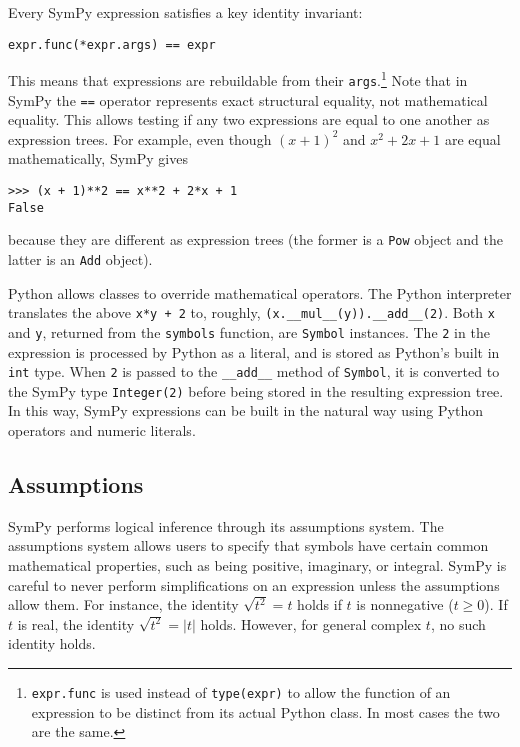 Every SymPy expression satisfies a key identity invariant:
\begin{verbatim}
expr.func(*expr.args) == expr
\end{verbatim}
This means that expressions are
rebuildable from their \texttt{args}.\footnote{\texttt{expr.func} is used
instead of \texttt{type(expr)} to allow the function of an expression to be
distinct from its actual Python class. In most cases the two are the same.}
Note that in SymPy the \texttt{==} operator represents exact
structural equality, not mathematical equality. This allows testing if any two
expressions are equal to one another as expression trees. For example, even
though ${(x + 1)}^2$ and $x^2 + 2x + 1$ are equal mathematically, SymPy gives
\begin{verbatim}
>>> (x + 1)**2 == x**2 + 2*x + 1
False
\end{verbatim}
because they are different as expression trees (the former is a \verb|Pow|
object and the latter is an \verb|Add| object).

Python allows classes to override mathematical operators. The Python
interpreter translates the above \texttt{x*y + 2} to, roughly,
\verb|(x.__mul__(y)).__add__(2)|. Both \texttt{x} and \texttt{y}, returned
from the \texttt{symbols} function, are \texttt{Symbol} instances. The
\texttt{2} in the expression is processed by Python as a literal, and is
stored as Python's built in \texttt{int} type. When \texttt{2} is passed to the
\verb|__add__| method of \texttt{Symbol}, it is converted to the SymPy type
\verb|Integer(2)| before being stored in the resulting expression tree. In
this way, SymPy expressions can be built in the natural way using Python
operators and numeric literals.

\subsection{Assumptions}
\label{sec:assumptions}

SymPy performs logical inference through its assumptions system. The
assumptions system allows users to specify that symbols have certain common
mathematical properties, such as being positive, imaginary, or integral. SymPy
is careful to never perform simplifications on an expression unless the
assumptions allow them. For instance, the identity $\sqrt{t^2} = t$ holds if
$t$ is nonnegative ($t\ge 0$). If $t$ is real, the identity $\sqrt{t^2}=|t|$
holds. However, for general complex $t$, no such identity holds.

